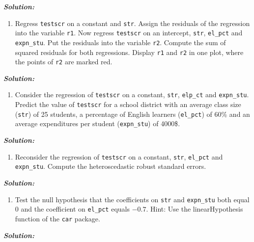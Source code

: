 \documentclass[]{article}
\providecommand{\tightlist}{%
  \setlength{\itemsep}{0pt}\setlength{\parskip}{0pt}}
\begin{document}
\textbf{\emph{Solution:}}

\begin{enumerate}
\def\labelenumi{\arabic{enumi}.}
\setcounter{enumi}{1}
\tightlist
\item
  Regress \texttt{testscr} on a constant and \texttt{str}. Assign the
  residuals of the regression into the variable \texttt{r1}. Now regress
  \texttt{testscr} on an intercept, \texttt{str}, \texttt{el\_pct} and
  \texttt{expn\_stu}. Put the residuals into the variable \texttt{r2}.
  Compute the sum of squared residuals for both regressions. Display
  \texttt{r1} and \texttt{r2} in one plot, where the points of
  \texttt{r2} are marked red.
\end{enumerate}

\textbf{\emph{Solution:}}

\begin{enumerate}
\def\labelenumi{\arabic{enumi}.}
\setcounter{enumi}{2}
\tightlist
\item
  Consider the regression of \texttt{testscr} on a constant,
  \texttt{str}, \texttt{elp\_ct} and \texttt{expn\_stu}. Predict the
  value of \texttt{testscr} for a school district with an average class
  size (\texttt{str}) of 25 students, a percentage of English learners
  (\texttt{el\_pct}) of 60\% and an average expenditures per student
  (\texttt{expn\_stu}) of 4000\$.
\end{enumerate}

\textbf{\emph{Solution:}}

\begin{enumerate}
\def\labelenumi{\arabic{enumi}.}
\setcounter{enumi}{3}
\tightlist
\item
  Reconsider the regression of \texttt{testscr} on a constant,
  \texttt{str}, \texttt{el\_pct} and \texttt{expn\_stu}. Compute the
  heteroscedastic robust standard errors.
\end{enumerate}

\textbf{\emph{Solution:}}

\begin{enumerate}
\def\labelenumi{\arabic{enumi}.}
\setcounter{enumi}{4}
\tightlist
\item
  Test the null hypothesis that the coefficients on \texttt{str} and
  \texttt{expn\_stu} both equal \(0\) and the coefficient on
  \texttt{el\_pct} equals \(-0.7\). Hint: Use the linearHypothesis
  function of the \texttt{car} package.
\end{enumerate}

\textbf{\emph{Solution:}}
\end{document}
